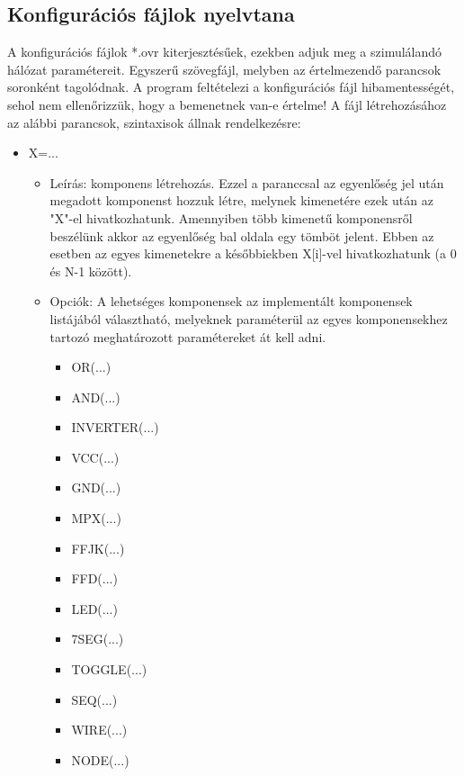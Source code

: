 \subsection{Konfigurációs fájlok nyelvtana}
A konfigurációs fájlok *.ovr kiterjesztésűek, ezekben adjuk meg a szimulálandó hálózat paramétereit. Egyszerű szövegfájl, melyben az értelmezendő parancsok soronként tagolódnak. A program feltételezi a konfigurációs fájl hibamentességét, sehol nem ellenőrizzük, hogy a bemenetnek van-e értelme!\linebreak
A fájl létrehozásához az alábbi parancsok, szintaxisok állnak rendelkezésre:

\begin{itemize}
\item X=...
	\begin{itemize}
	\item Leírás: komponens létrehozás. Ezzel a paranccsal az egyenlőség jel után megadott komponenst hozzuk létre, melynek kimenetére ezek után az "X"-el hivatkozhatunk. Amennyiben több kimenetű komponensről beszélünk akkor az egyenlőség bal oldala egy tömböt jelent. Ebben az esetben az egyes kimenetekre a későbbiekben X[i]-vel hivatkozhatunk (a 0 és N-1 között).
	\item Opciók: A lehetséges komponensek az implementált komponensek listájából választható, melyeknek paraméterül az egyes komponensekhez tartozó meghatározott paramétereket át kell adni.
		\begin{itemize}
			\item OR(...)			%
			\item AND(...)			%
			\item INVERTER(...)		%
			\item VCC(...)			%
			\item GND(...)			%
			\item MPX(...)			%
			\item FFJK(...)			%
			\item FFD(...)			%
			\item LED(...)			%
			\item 7SEG(...)			%
			\item TOGGLE(...)		%
			\item SEQ(...)			%
			\item WIRE(...)			%
			\item NODE(...)			%
		\end{itemize}
	\end{itemize}


\end{itemize}
